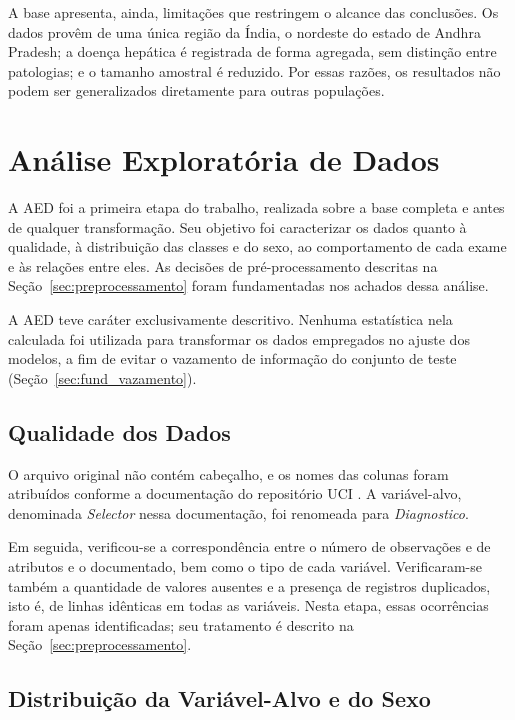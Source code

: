 A base apresenta, ainda, limitações que restringem o alcance das conclusões. Os dados provêm de uma única região da Índia, o nordeste do estado de Andhra Pradesh; a doença hepática é registrada de forma agregada, sem distinção entre patologias; e o tamanho amostral é reduzido. Por essas razões, os resultados não podem ser generalizados diretamente para outras populações.

\section{Análise Exploratória de Dados}
\label{sec:aed}

A AED \cite{exploratorydataanalysis} foi a primeira etapa do trabalho, realizada sobre a base completa e antes de qualquer transformação. Seu objetivo foi caracterizar os dados quanto à qualidade, à distribuição das classes e do sexo, ao comportamento de cada exame e às relações entre eles. As decisões de pré-processamento descritas na Seção~\ref{sec:preprocessamento} foram fundamentadas nos achados dessa análise.

A AED teve caráter exclusivamente descritivo. Nenhuma estatística nela calculada foi utilizada para transformar os dados empregados no ajuste dos modelos, a fim de evitar o vazamento de informação do conjunto de teste (Seção~\ref{sec:fund_vazamento}).

\subsection{Qualidade dos Dados}
\label{sec:qualidade_dados}

O arquivo original não contém cabeçalho, e os nomes das colunas foram atribuídos conforme a documentação do repositório UCI \cite{ramana2022ilpd}. A variável-alvo, denominada \textit{Selector} nessa documentação, foi renomeada para \textit{Diagnostico}.

Em seguida, verificou-se a correspondência entre o número de observações e de atributos e o documentado, bem como o tipo de cada variável. Verificaram-se também a quantidade de valores ausentes e a presença de registros duplicados, isto é, de linhas idênticas em todas as variáveis. Nesta etapa, essas ocorrências foram apenas identificadas; seu tratamento é descrito na Seção~\ref{sec:preprocessamento}.

\subsection{Distribuição da Variável-Alvo e do Sexo}
\label{sec:distribuicao_alvo_sexo}

